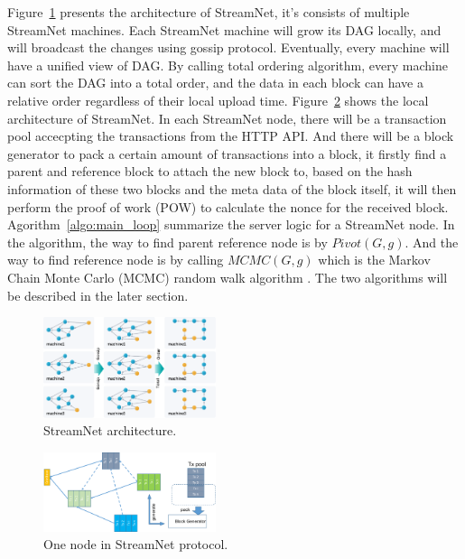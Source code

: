 Figure~\ref{architecture} presents the architecture of StreamNet,
it's consists of multiple StreamNet machines.
Each StreamNet machine will grow its DAG locally, and will broadcast the changes using gossip protocol. 
Eventually, every machine will have a unified view of DAG.
By calling total ordering algorithm, every machine can sort the DAG into a total order, 
and the data in each block can have a relative order regardless of their local upload time.
Figure~\ref{node} shows the local architecture of StreamNet.
In each StreamNet node, there will be a transaction pool accecpting the transactions from the HTTP API.
And there will be a block generator to pack a certain amount of transactions into a block, it firstly find a 
parent and reference block to attach the new block to, based on the hash information of these two blocks and the meta data of the block itself, 
it will then perform the proof of work (POW) to calculate the nonce for the received block.
Agorithm~\ref{algo:main_loop} summarize the server logic for a StreamNet node.
In the algorithm, the way to find parent reference node is by $Pivot(G, g)$.
And the way to find reference node is by calling $MCMC(G, g)$ which is the Markov Chain Monte Carlo (MCMC) random walk algorithm \cite{popov2016tangle}.
The two algorithms will be described in the later section.

\begin{figure}[!ht]
\begin{center}
\includegraphics[width=0.45\textwidth]{figures/architecture.pdf}
    \caption{
        StreamNet architecture.
     }
\label{architecture}
\end{center}
\end{figure}

\begin{figure}[!ht]
\begin{center}
\includegraphics[width=0.45\textwidth]{figures/node.pdf}
    \caption{
        One node in StreamNet protocol.
     }
\label{node}
\end{center}
\end{figure}

